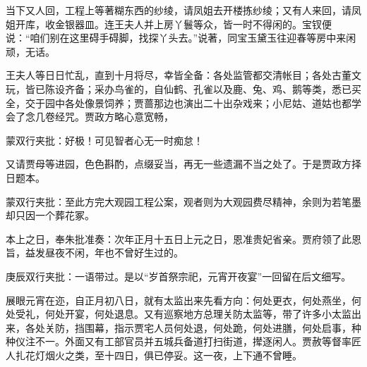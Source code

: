 \begin{parag}
    当下又人回，工程上等著糊东西的纱绫，请凤姐去开楼拣纱绫；又有人来回，请凤姐开库，收金银器皿。连王夫人并上房丫鬟等众，皆一时不得闲的。宝钗便说：“咱们别在这里碍手碍脚，找探丫头去。”说著，同宝玉黛玉往迎春等房中来闲顽，无话。
\end{parag}


\begin{parag}
    王夫人等日日忙乱，直到十月将尽，幸皆全备：各处监管都交清帐目；各处古董文玩，皆已陈设齐备；采办鸟雀的，自仙鹤、孔雀以及鹿、兔、鸡、鹅等类，悉已买全，交于园中各处像景饲养；贾蔷那边也演出二十出杂戏来；小尼姑、道姑也都学会了念几卷经咒。贾政方略心意宽畅，\begin{note}蒙双行夹批：好极！可见智者心无一时痴怠！\end{note}又请贾母等进园，色色斟酌，点缀妥当，再无一些遗漏不当之处了。于是贾政方择日题本。\begin{note}蒙双行夹批：至此方完大观园工程公案，观者则为大观园费尽精神，余则为若笔墨却只因一个葬花冢。\end{note}本上之日，奉朱批准奏：次年正月十五日上元之日，恩准贵妃省亲。贾府领了此恩旨，益发昼夜不闲，年也不曾好生过的。\begin{note}庚辰双行夹批：一语带过。是以“岁首祭宗祀，元宵开夜宴”一回留在后文细写。\end{note}
\end{parag}


\begin{parag}
    展眼元宵在迩，自正月初八日，就有太监出来先看方向：何处更衣，何处燕坐，何处受礼，何处开宴，何处退息。又有巡察地方总理关防太监等，带了许多小太监出来，各处关防，挡围幕，指示贾宅人员何处退，何处跪，何处进膳，何处启事，种种仪注不一。外面又有工部官员并五城兵备道打扫街道，撵逐闲人。贾赦等督率匠人扎花灯烟火之类，至十四日，俱已停妥。这一夜，上下通不曾睡。
\end{parag}


